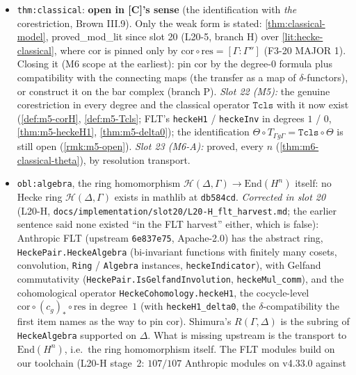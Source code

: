 \begin{remark}\label{rmk:m4-g5-headers}
  \begin{itemize}
    \item [C] \texttt{thm:classical}: \textbf{open in [C]'s sense} (the identification with \emph{the} corestriction, Brown III.9).
      Only the weak form is stated: \ref{thm:classical-model}, \textsf{proved\_mod\_lit} since slot 20 (L20-5, branch H) over
      \ref{lit:hecke-classical}, where $\mathrm{cor}$ is pinned only by $\mathrm{cor}\circ\mathrm{res}=[\Gamma:\Gamma'']$ (F3-20
      MAJOR 1). Closing it (M6 scope at the earliest): pin $\mathrm{cor}$ by the degree-$0$ formula plus compatibility with the
      connecting maps (the transfer as a map of $\delta$-functors), or construct it on the bar complex (branch P). \emph{Slot 22
      (M5):} the genuine corestriction in every degree and the classical operator $\texttt{Tcls}$ with it now exist
      (\ref{def:m5-corH}, \ref{def:m5-Tcls}; FLT's \texttt{heckeH1} / \texttt{heckeInv} in degrees $1$ / $0$, \ref{thm:m5-heckeH1},
      \ref{thm:m5-delta0}); the identification $\Theta\circ T_{\Gamma g\Gamma}=\texttt{Tcls}\circ\Theta$ is still open (\ref{rmk:m5-open}).
      \emph{Slot 23 (M6-A):} proved, every $n$ (\ref{thm:m6-classical-theta}), by resolution transport.
    \item [C] \texttt{obl:algebra}, the ring homomorphism $\mathcal H(\Delta,\Gamma)\to\mathrm{End}(H^n)$ itself: no Hecke ring
      $\mathcal H(\Delta,\Gamma)$ exists in mathlib at \texttt{db584cd}. \emph{Corrected in slot 20} (L20-H,
      \texttt{docs/implementation/slot20/L20-H\_flt\_harvest.md}; the earlier sentence said none existed ``in the FLT harvest'' either, which is
      false): Anthropic FLT (upstream \texttt{6e837e75}, Apache-2.0) has the abstract ring, \texttt{HeckePair.HeckeAlgebra}
      (bi-invariant functions with finitely many cosets, convolution, \texttt{Ring} / \texttt{Algebra} instances, \texttt{heckeIndicator}), with
      Gelfand commutativity (\texttt{HeckePair.IsGelfandInvolution}, \texttt{heckeMul\_comm}), and the cohomological operator
      \texttt{HeckeCohomology.heckeH1}, the cocycle-level $\mathrm{cor}\circ(c_g)_\ast\circ\mathrm{res}$ in degree~$1$ (with
      \texttt{heckeH1\_delta0}, the $\delta$-compatibility the first item names as the way to pin $\mathrm{cor}$). Shimura's $R(\Gamma,\Delta)$
      is the subring of \texttt{HeckeAlgebra} supported on $\Delta$. What is missing upstream is the transport to $\mathrm{End}(H^n)$, i.e.\ the
      ring homomorphism itself. The FLT modules build on our toolchain (L20-H stage~2: $107/107$ Anthropic modules on v4.33.0 against

\end{itemize}
\end{remark}
